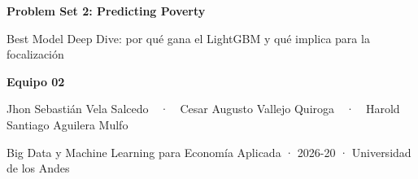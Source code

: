{
\begin{frame}[plain]
  \color{white}
  \vspace*{7.5mm}
  {\bfseries\fontsize{24}{28}\selectfont Problem Set 2: Predicting Poverty\par}
  \vspace{0.9mm}{\color{naranja}\rule{22mm}{1.8pt}}\par
  \vspace{4.5mm}
  {\fontsize{13}{15.7}\selectfont Best Model Deep Dive: por qué gana el LightGBM y qué implica para la focalización\par}
  \vspace{9.7mm}
  {\bfseries\normalsize Equipo 02\par}
  \vspace{1.3mm}
  {\small Jhon Sebastián Vela Salcedo \ \,·\ \, Cesar Augusto Vallejo Quiroga \ \,·\ \, Harold Santiago Aguilera Mulfo\par}
  \vspace{3.85mm}
  {\footnotesize Big Data y Machine Learning para Economía Aplicada · 2026-20 · Universidad de los Andes\par}
\end{frame}}

